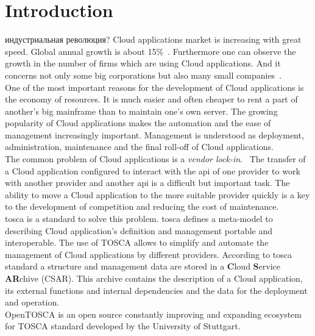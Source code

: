
\chapter{Introduction}
индустриальная революция?
\fi
Cloud applications market is increasing with great speed. 
Global annual growth is about 15\%~\cite*{statista_global}.
Furthermore one can observe the growth in the number of firms which are using Cloud applications. 
And it concerns not only some big corporations but also many small companies~\cite*{destatis_2014, destatis_2016}. \\ 
One of the most important reasons for the development of Cloud applications is the economy of resources.
It is much easier and often cheaper to rent a part of another's big mainframe than to maintain one's own server.
The growing popularity of Cloud applications makes the automation and the ease of management increasingly important.
Management is understood as deployment, administration, maintenance and the final roll-off of Cloud applications.~\cite*{autocloud} \\   
The common problem of Cloud applications is a \emph{vendor lock-in}.~\cite*{lockin} 
The transfer of a Cloud application configured to interact with the \gls{api} of one provider to work with another provider and another \gls{api} is a difficult but important task. 
The ability to move a Cloud application to the more suitable provider quickly is a key to the development of competition and reducing the cost of maintenance.\\ %
\gls{tosca} \cite*{TOSCA-v1.0} is a standard to solve this problem. 
\gls{tosca} defines a meta-model to describing Cloud application's definition and management portable and interoperable. 
The use of TOSCA allows to simplify and automate the management of Cloud applications by different providers. 
According to \gls{tosca} standard a structure and management data are stored in a \textbf{C}loud \textbf{S}ervice \textbf{AR}chive (CSAR).
This archive contains the description of a Cloud application, its external functions and internal dependencies and the data for the deployment and operation.\\
OpenTOSCA \cite*{OpenTOSCA} is an open source constantly improving and expanding ecosystem for TOSCA standard developed by the University of Stuttgart.
